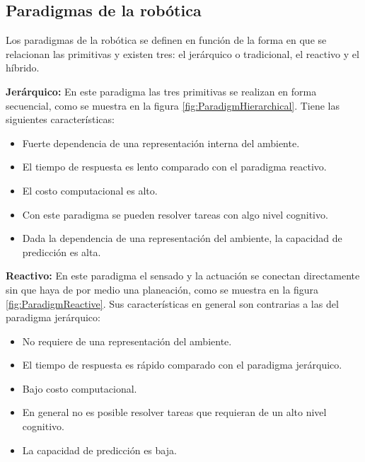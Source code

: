 \subsection{Paradigmas de la robótica}
Los paradigmas de la robótica se definen en función de la forma en que se relacionan las primitivas y existen tres: el jerárquico o tradicional, el reactivo y el híbrido. 

\textbf{Jerárquico:} En este paradigma las tres primitivas se realizan en forma secuencial, como se muestra en la figura  \ref{fig:ParadigmHierarchical}. Tiene las siguientes características:
\begin{itemize}
	\item Fuerte dependencia de una representación interna del ambiente. 
	\item El tiempo de respuesta es lento comparado con el paradigma reactivo. 
	\item El costo computacional es alto.
	\item Con este paradigma se pueden resolver tareas con algo nivel cognitivo.
	\item Dada la dependencia de una representación del ambiente, la capacidad de predicción es alta.
\end{itemize}

\textbf{Reactivo:} En este paradigma el sensado y la actuación se conectan directamente sin que haya de por medio una planeación, como se muestra en la figura \ref{fig:ParadigmReactive}. Sus características en general son contrarias a las del paradigma jerárquico:
\begin{itemize}
	\item No requiere de una representación del ambiente.
	\item El tiempo de respuesta es rápido comparado con el paradigma jerárquico.
	\item Bajo costo computacional.
	\item En general no es posible resolver tareas que requieran de un alto nivel cognitivo.
	\item La capacidad de predicción es baja. 
\end{itemize}

